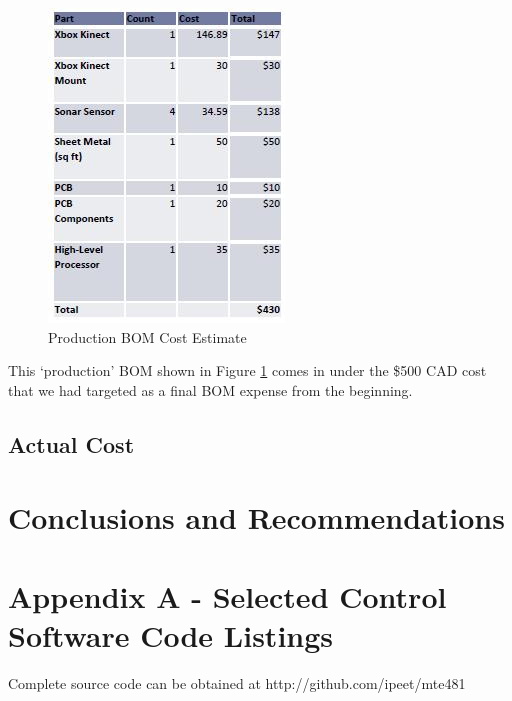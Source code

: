 \documentclass[oneside,final,a4paper]{report}
\begin{document}
\begin{figure}[hbt]
 \centering
 \includegraphics[scale=0.8]{BOM_production}
 \caption{Production BOM Cost Estimate}
 \label{fig:BOM_prod}
\end{figure}

This `production' BOM shown in Figure \ref{fig:BOM_prod} comes in under the \$500 CAD cost that we had targeted as a final BOM expense from the beginning.


\section{Actual Cost}


\chapter{Conclusions and Recommendations}

\renewcommand{\thesection}{\Alph{chapter}.\arabic{section}}

\chapter*{Appendix A - Selected Control Software Code Listings}
\setcounter{chapter}{1}
Complete source code can be obtained at http://github.com/ipeet/mte481
\end{document}
